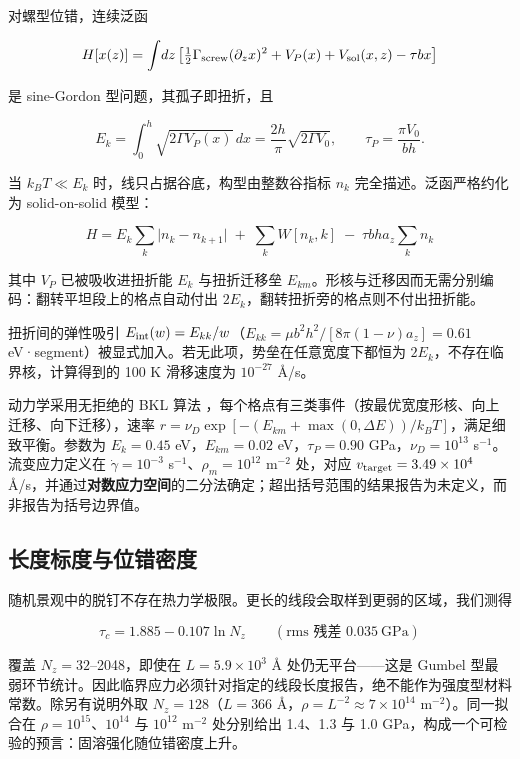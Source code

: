 对螺型位错，连续泛函

\[H[x(z)] = \int\!dz\left[\tfrac12\Gamma_{\rm screw}(\partial_z x)^2 + V_P(x) + V_{\rm sol}(x,z) - \tau b x\right]\]

是 sine-Gordon 型问题，其孤子即扭折，且

\[E_k = \int_0^h\!\sqrt{2\Gamma V_P(x)}\,dx = \frac{2h}{\pi}\sqrt{2\Gamma V_0},\qquad \tau_P = \frac{\pi V_0}{bh}.\]

当 \(k_BT \ll E_k\) 时，线只占据谷底，构型由整数谷指标 \(n_k\) 完全描述。泛函严格约化为 solid-on-solid 模型：

\[\boxed{\;H = E_k\sum_k\bigl|n_k - n_{k+1}\bigr| \;+\; \sum_k W[n_k,k] \;-\; \tau b h a_z\sum_k n_k\;}\]

其中 \(V_P\) 已被吸收进扭折能 \(E_k\) 与扭折迁移垒 \(E_{km}\)。形核与迁移因而无需分别编码：翻转平坦段上的格点自动付出 \(2E_k\)，翻转扭折旁的格点则不付出扭折能。

扭折间的弹性吸引 \(E_{\rm int}(w) = E_{kk}/w\)（\(E_{kk} = \mu b^2h^2/[8\pi(1-\nu)a_z] = 0.61\) eV·segment）被显式加入。若无此项，势垒在任意宽度下都恒为 \(2E_k\)，不存在临界核，计算得到的 100 K 滑移速度为 \(10^{-27}\) Å/s。

动力学采用无拒绝的 BKL 算法 \cite{bortz1975}，每个格点有三类事件（按最优宽度形核、向上迁移、向下迁移），速率 \(r = \nu_D\exp[-(E_{km} + \max(0,\Delta E))/k_BT]\)，满足细致平衡。参数为 \(E_k = 0.45\) eV，\(E_{km} = 0.02\) eV，\(\tau_P = 0.90\) GPa，\(\nu_D = 10^{13}\) s\(^{-1}\)。流变应力定义在 \(\dot\gamma = 10^{-3}\) s\(^{-1}\)、\(\rho_m = 10^{12}\) m\(^{-2}\) 处，对应 \(v_{\rm target} = 3.49\times10^4\) Å/s，并通过\textbf{对数应力空间}的二分法确定；超出括号范围的结果报告为未定义，而非报告为括号边界值。

\hypertarget{ux957fux5ea6ux6807ux5ea6ux4e0eux4f4dux9519ux5bc6ux5ea6}{%
\subsection{长度标度与位错密度}\label{sec:ux957fux5ea6ux6807ux5ea6ux4e0eux4f4dux9519ux5bc6ux5ea6}}

随机景观中的脱钉不存在热力学极限。更长的线段会取样到更弱的区域，我们测得

\[\tau_c = 1.885 - 0.107\ln N_z\qquad(\text{rms 残差 }0.035\ \text{GPa})\]

覆盖 \(N_z = 32\)--2048，即使在 \(L = 5.9\times10^3\) Å 处仍无平台------这是 Gumbel 型最弱环节统计。因此临界应力必须针对指定的线段长度报告，绝不能作为强度型材料常数。除另有说明外取 \(N_z = 128\)（\(L = 366\) Å，\(\rho = L^{-2}\approx7\times10^{14}\) m\(^{-2}\)）。同一拟合在 \(\rho = 10^{15}\)、\(10^{14}\) 与 \(10^{12}\) m\(^{-2}\) 处分别给出 1.4、1.3 与 1.0 GPa，构成一个可检验的预言：固溶强化随位错密度上升。

